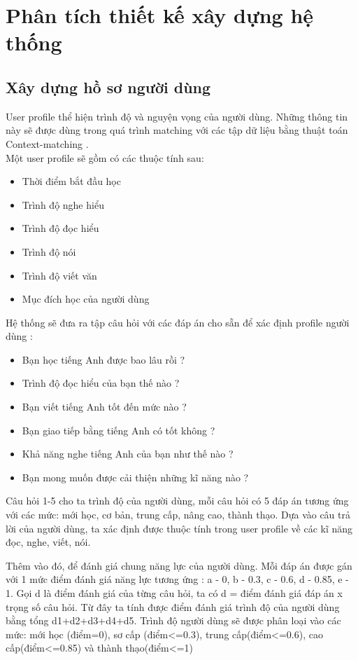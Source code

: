 
\chapter{Phân tích thiết kế xây dựng hệ thống} \label{design-analysis}


\section{Xây dựng hồ sơ người dùng}
User profile thể hiện trình độ và nguyện vọng của người dùng. Những thông tin này sẽ được dùng trong quá trình matching với các tập dữ liệu bằng thuật toán Context-matching . \\
Một user profile sẽ gồm có các thuộc tính sau:
\begin{itemize}
\item Thời điểm bắt đầu học
\item Trình độ nghe hiểu
\item Trình độ đọc hiểu
\item Trình độ nói
\item Trình độ viết văn
\item Mục đích học của người dùng\\
\end{itemize}
Hệ thống sẽ đưa ra tập câu hỏi với các đáp án cho sẵn để xác định profile người dùng :
\begin{itemize}
\item Bạn học tiếng Anh được bao lâu rồi ?
\item Trình độ đọc hiểu của bạn thế nào ?
\item Bạn viết tiếng Anh tốt đến mức nào ?
\item Bạn giao tiếp bằng tiếng Anh có tốt không ?
\item Khả năng nghe tiếng Anh của bạn như thế nào ?
\item Bạn mong muốn được cải thiện những kĩ năng nào ?	
\end{itemize}

Câu hỏi 1-5 cho ta trình độ của người dùng, mỗi câu hỏi có 5 đáp án tương ứng với các mức: mới học, cơ bản, trung cấp, nâng cao, thành thạo. Dựa vào câu trả lời của người dùng, ta xác định được thuộc tính trong user profile về các kĩ năng đọc, nghe, viết, nói.

Thêm vào đó, để đánh giá chung năng lực của người dùng. Mỗi đáp án được gán với 1 mức điểm đánh giá năng lực tương ứng : a - 0, b - 0.3, c - 0.6, d - 0.85, e - 1. Gọi d là điểm đánh giá của từng câu hỏi, ta có d = điểm đánh giá đáp án x trọng số câu hỏi. Từ đây ta tính được điểm đánh giá trình độ của người dùng bằng tổng d1+d2+d3+d4+d5. Trình độ người dùng sẽ được phân loại vào các mức: mới học (điểm=0), sơ cấp (điểm<=0.3), trung cấp(điểm<=0.6), cao cấp(điểm<=0.85) và thành thạo(điểm<=1)

